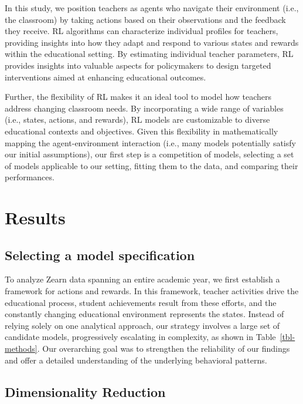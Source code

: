 \documentclass[
  number,
  preprint,
  3p,
  onecolumn]{elsarticle}
\begin{document}
In this study, we position teachers as agents who navigate their
environment (i.e., the classroom) by taking actions based on their
observations and the feedback they receive. RL algorithms can
characterize individual profiles for teachers, providing insights into
how they adapt and respond to various states and rewards within the
educational setting. By estimating individual teacher parameters, RL
provides insights into valuable aspects for policymakers to design
targeted interventions aimed at enhancing educational outcomes.

Further, the flexibility of RL makes it an ideal tool to model how
teachers address changing classroom needs. By incorporating a wide range
of variables (i.e., states, actions, and rewards), RL models are
customizable to diverse educational contexts and objectives. Given this
flexibility in mathematically mapping the agent-environment interaction
(i.e., many models potentially satisfy our initial assumptions), our
first step is a competition of models, selecting a set of models
applicable to our setting, fitting them to the data, and comparing their
performances.

\section{Results}\label{results}

\subsection{Selecting a model
specification}\label{selecting-a-model-specification}

To analyze Zearn data spanning an entire academic year, we first
establish a framework for actions and rewards. In this framework,
teacher activities drive the educational process, student achievements
result from these efforts, and the constantly changing educational
environment represents the states. Instead of relying solely on one
analytical approach, our strategy involves a large set of candidate
models, progressively escalating in complexity, as shown in
Table~\ref{tbl-methods}. Our overarching goal was to strengthen the
reliability of our findings and offer a detailed understanding of the
underlying behavioral patterns.

\subsection{Dimensionality Reduction}\label{dimensionality-reduction}
\end{document}
